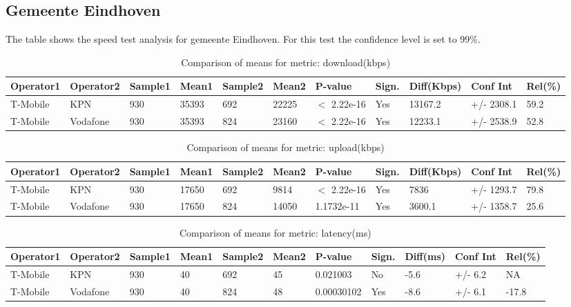 \documentclass[]{article}
\begin{document}
\normalsize

\newpage

\subsection{Gemeente Eindhoven}\label{gemeente-eindhoven}

The table shows the speed test analysis for gemeente Eindhoven. For this
test the confidence level is set to 99\%.

\begin{table}[ht]
\centering
{\footnotesize
\begin{tabular}{lllllllllll}
  \hline
Operator1 & Operator2 & Sample1 & Mean1 & Sample2 & Mean2 & P-value & Sign. & Diff(Kbps) & Conf Int & Rel(\%) \\ 
  \hline
T-Mobile & KPN & 930 & 35393 & 692 & 22225 & $<$ 2.22e-16 & Yes & 13167.2 & +/- 2308.1 & 59.2 \\ 
  T-Mobile & Vodafone & 930 & 35393 & 824 & 23160 & $<$ 2.22e-16 & Yes & 12233.1 & +/- 2538.9 & 52.8 \\ 
   \hline
\end{tabular}
}
\caption{Comparison of means for metric: download(kbps)} 
\end{table}

\begin{table}[ht]
\centering
{\footnotesize
\begin{tabular}{lllllllllll}
  \hline
Operator1 & Operator2 & Sample1 & Mean1 & Sample2 & Mean2 & P-value & Sign. & Diff(Kbps) & Conf Int & Rel(\%) \\ 
  \hline
T-Mobile & KPN & 930 & 17650 & 692 & 9814 & $<$ 2.22e-16 & Yes & 7836 & +/- 1293.7 & 79.8 \\ 
  T-Mobile & Vodafone & 930 & 17650 & 824 & 14050 & 1.1732e-11 & Yes & 3600.1 & +/- 1358.7 & 25.6 \\ 
   \hline
\end{tabular}
}
\caption{Comparison of means for metric: upload(kbps)} 
\end{table}

\begin{table}[ht]
\centering
{\footnotesize
\begin{tabular}{lllllllllll}
  \hline
Operator1 & Operator2 & Sample1 & Mean1 & Sample2 & Mean2 & P-value & Sign. & Diff(ms) & Conf Int & Rel(\%) \\ 
  \hline
T-Mobile & KPN & 930 & 40 & 692 & 45 & 0.021003 & No & -5.6 & +/- 6.2 & NA \\ 
  T-Mobile & Vodafone & 930 & 40 & 824 & 48 & 0.00030102 & Yes & -8.6 & +/- 6.1 & -17.8 \\ 
   \hline
\end{tabular}
}
\caption{Comparison of means for metric: latency(ms)} 
\end{table}
\end{document}
